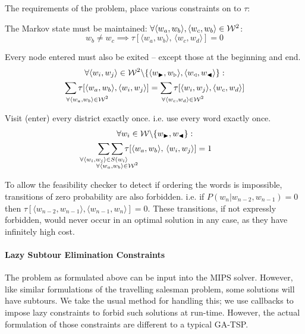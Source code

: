 \documentclass[twocolumn]{article}
\begin{document}
The requirements of the problem, place various constraints on to $\tau$:

The Markov state must be maintained: $\forall\langle w_{a},w_{b}\rangle,\langle w_{c},w_{b}\rangle\in\mathcal{W}^{2}$:
\begin{equation*}
w_{b}\ne w_{c} \implies \tau[\langle w_{a},w_{b}\rangle,\,\langle w_{c},w_{d}\rangle]=0
\end{equation*}

Every node entered must also be exited -- except those at the beginning and end.
\begin{multline*}
\forall\langle w_{i},w_{j}\rangle\in\W^{2}\backslash\{\langle\s,\ss\rangle,\langle\e,\ee\rangle\}: \\
 \sum_{\mathrlap{\!\!\!\!\forall\langle w_{a},w_{b}\rangle\in\W^{2}}}\tau[\langle w_{a},w_{b}\rangle,\langle w_{i},w_{j}\rangle]
=\sum_{\mathrlap{\!\!\!\!\forall\langle w_{c},w_{d}\rangle\in\W^{2}}}\tau[\langle w_{i},w_{j}\rangle,\langle w_{c},w_{d}\rangle]
\end{multline*}

Visit (enter) every district exactly once. i.e. use every word exactly once.
\begin{multline*}
\forall w_{i}\in\W\backslash\{\s,\ee\}: \\
\sum_{\mathclap{\forall\langle w_{i},w_{j}\rangle\in S(w_{i}\rangle}}
\sum_{\mathclap{\substack{\; \\ \;\\ \forall\langle w_{a},w_{b}\rangle\in\W^{2}}}}
\tau[\langle w_{a},w_{b}\rangle,\,\langle w_{i},w_{j}\rangle]=1
\end{multline*}

To allow the feasibility checker to detect if ordering the words is
impossible, transitions of zero probability are also forbidden. i.e. if
$P(w_{n}|w_{n-2},w_{n-1})=0$ then $\tau[\langle w_{n-2},w_{n-1}\rangle,\langle w_{n-1},w_{n}\rangle]=0$.
These transitions, if not expressly forbidden, would never occur in
an optimal solution in any case, as they have infinitely high cost.


\paragraph{Lazy Subtour Elimination Constraints}

The problem as formulated above can be input into the MIPS solver. However, like similar formulations of the
travelling salesman problem, some solutions will have subtours.
We take the usual method for handling this; we use callbacks to impose
lazy constraints to forbid such solutions at run-time.  
However, the actual formulation of those constraints are different to a typical GA-TSP.
\end{document}
